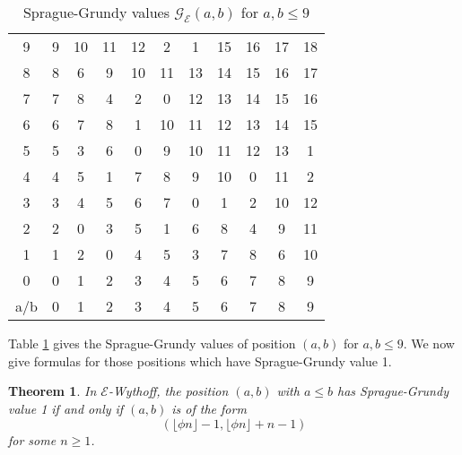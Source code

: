 \documentclass[12pt]{amsart}
\theoremstyle{plain}
\newtheorem{theorem}[proposition]{Theorem}
\theoremstyle{definition}
\theoremstyle{remark}
\begin{document}
\begin{table}[ht]
\begin{center}
\begin{tabular}{c|cccccccccc}
9     &9 &10&11&12&2   &1  &15  &16 &17  &18 \\
8     &8 &6 &9  &10 &11 &13&14  &15 &16  &17 \\
7     &7 &8 &4  &2  &0   &12 &13 &14  &15  &16 \\
6     &6 &7 &8  &1  &10 &11 &12 &13  &14  &15 \\
5     &5 &3 &6  &0  &9   &10 &11 &12  &13  &1 \\
4     &4 &5 &1  &7  &8   &9  &10  &0   &11   &2\\
3     &3 &4 &5  &6  &7   &0  &1   &2    &10   &12 \\
2     &2 &0 &3  &5  &1   &6  &8   &4    &9     &11 \\
1     &1 &2 &0  &4  &5   &3  &7   &8    &6     &10 \\
0     &0 &1 &2  &3  &4   &5  &6   &7    &8     &9 \\
\hline
a/b &0&1&2&3&4&5&6&7&8&9
 \end{tabular}
\caption{Sprague-Grundy values ${\mathcal{G}}_{\mathcal{E}}(a,b)$ for $a,b\leq 9$}\label{T2}
\end{center}
\end{table}

Table \ref{T2} gives the  Sprague-Grundy values of position $(a,b)$ for $a,b\leq 9$. We now give formulas for those positions which have Sprague-Grundy value 1.

\smallskip
\begin{theorem} \label{CW-V1}
In ${\mathcal{E}}$-Wythoff, the position $(a,b)$ with $a \leq b$ has Sprague-Grundy value 1 if and only if $(a,b)$ is of the form
\[(\lfloor \phi n \rfloor - 1, \lfloor \phi n \rfloor +n-1)\]
for some $n \geq 1$.
\end{theorem}
\end{document}

